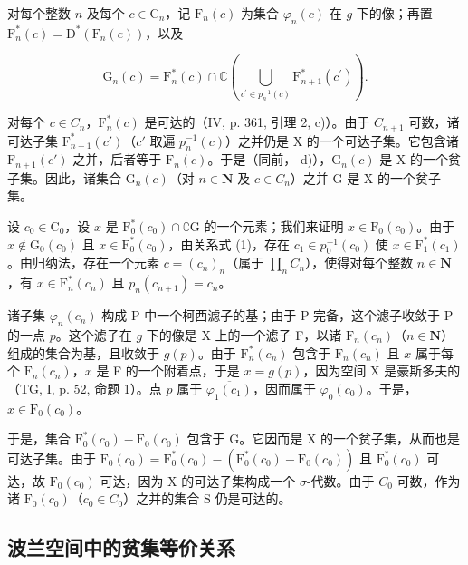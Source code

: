 对每个整数 \(n\) 及每个 \(c \in \mathrm{C}_n\)，记 \(\mathrm{F}_n(c)\) 为集合 \(\varphi_n(c)\) 在 \(g\) 下的像；再置 \(\mathrm{F}_n^*(c) = \mathrm{D}^*(\mathrm{F}_n(c))\)，以及

\[
\mathrm{G} _ {n} (c) = \mathrm{F} _ {n} ^ {*} (c) \cap \mathbb {C} \left(\bigcup_ {c ^ {\prime} \in p _ {n} ^ {- 1} (c)} \mathrm{F} _ {n + 1} ^ {*} (c ^ {\prime})\right).\tag{1}
\]

对每个 \(c \in C_{n}\)，\(\mathrm{F}_{n}^{*}(c)\) 是可达的（IV, p. 361, 引理 2, c)）。由于 \(C_{n+1}\) 可数，诸可达子集 \(\mathrm{F}_{n+1}^{*}(c')\)（\(c'\) 取遍 \(p_{n}^{-1}(c)\)）之并仍是 X 的一个可达子集。它包含诸 \(\mathrm{F}_{n+1}(c')\) 之并，后者等于 \(\mathrm{F}_{n}(c)\)。于是（同前， d)），\(\mathrm{G}_{n}(c)\) 是 X 的一个贫子集。因此，诸集合 \(\mathrm{G}_{n}(c)\)（对 \(n \in \mathbf{N}\) 及 \(c \in C_{n}\)）之并 G 是 X 的一个贫子集。

设 \(c_0 \in \mathrm{C}_0\)，设 \(x\) 是 \(\mathrm{F}_0^*(c_0) \cap \complement \mathrm{G}\) 的一个元素；我们来证明 \(x \in \mathrm{F}_0(c_0)\)。由于 \(x \notin \mathrm{G}_0(c_0)\) 且 \(x \in \mathrm{F}_0^*(c_0)\)，由关系式 (1)，存在 \(c_1 \in p_0^{-1}(c_0)\) 使 \(x \in \mathrm{F}_1^*(c_1)\)。由归纳法，存在一个元素 \(c = (c_n)_n\)（属于 \(\prod_n C_n\)），使得对每个整数 \(n \in \mathbf{N}\)，有 \(x \in \mathrm{F}_n^*(c_n)\) 且 \(p_n(c_{n+1}) = c_n\)。

诸子集 \(\varphi_n(c_n)\) 构成 P 中一个柯西滤子的基；由于 P 完备，这个滤子收敛于 P 的一点 \(p\)。这个滤子在 \(g\) 下的像是 X 上的一个滤子 F，以诸 \(\mathrm{F}_n(c_n)\)（\(n\in \mathbf{N}\)）组成的集合为基，且收敛于 \(g(p)\)。由于 \(\mathrm{F}_n^* (c_n)\) 包含于 \(\overline{\mathrm{F}_n(c_n)}\) 且 \(x\) 属于每个 \(\mathrm{F}_n(c_n)\)，\(x\) 是 F 的一个附着点，于是 \(x = g(p)\)，因为空间 X 是豪斯多夫的（TG, I, p. 52, 命题 1）。点 \(p\) 属于 \(\overline{\varphi_1(c_1)}\)，因而属于 \(\varphi_0(c_0)\)。于是，\(x\in \mathrm{F}_0(c_0)\)。

于是，集合 \(\mathrm{F}_{0}^{*}(c_{0}) - \mathrm{F}_{0}(c_{0})\) 包含于 G。它因而是 X 的一个贫子集，从而也是可达子集。由于 \(\mathrm{F}_{0}(c_{0}) = \mathrm{F}_{0}^{*}(c_{0}) - (\mathrm{F}_{0}^{*}(c_{0}) - \mathrm{F}_{0}(c_{0}))\) 且 \(\mathrm{F}_{0}^{*}(c_{0})\) 可达，故 \(\mathrm{F}_{0}(c_{0})\) 可达，因为 X 的可达子集构成一个 \(\sigma\)-代数。由于 \(C_{0}\) 可数，作为诸 \(\mathrm{F}_{0}(c_{0})\)（\(c_{0} \in C_{0}\)）之并的集合 S 仍是可达的。

\subsection{波兰空间中的贫集等价关系}

